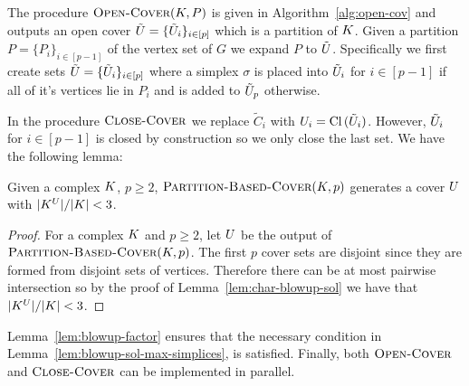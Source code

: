 \documentclass{jocg}
\begin{document}
The procedure $\textnormal{\scshape Open-Cover}(K,P)$ is given in Algorithm~\ref{alg:open-cov} and outputs an open cover $\tilde{U} = \{\tilde{U}_i\}_{i \in [p]}$ which is a partition of $K$. Given a partition $P = \{P_i\}_{i \in [p-1]}$ of the vertex set of $G$ we expand $P$ to $\tilde{U}$. Specifically we first create sets 
$\tilde{U} = \{\tilde{U}_i\}_{i \in [p]}$ where a simplex $\sigma$ is placed into $\tilde{U}_i$ for $i \in [p-1]$ 
if all of it's vertices lie in $P_i$ and is added to $\tilde{U}_p$ otherwise. 

In the procedure $\textnormal{\scshape Close-Cover}$ we replace $\tilde{C}_{i}$ with $U_i = \operatorname{Cl}{(\tilde{U}_i)}$. However, $\tilde{U}_i$ for $i \in [p-1]$ is closed by construction so we only close the last set.  We have the following lemma: 
\begin{lemma}
\label{lem:blowup-factor}
Given a complex $K$, $p \geq 2$, $\textnormal{\scshape Partition-Based-Cover}(K, p)$ 
generates a cover $U$ with $|K^{U}|/|K| < 3$. 
\end{lemma}
\begin{proof}
For a complex $K$ and $p \geq 2$, let $U$ be the output of 
$\textnormal{\scshape Partition-Based-Cover}(K,p)$. The first
$p$ cover sets are disjoint since they are formed from disjoint sets of vertices.
Therefore there can be at most pairwise intersection so by the proof of Lemma~\ref{lem:char-blowup-sol} we have that $|K^{U}|/|K| < 3$.
\end{proof}
Lemma~\ref{lem:blowup-factor} ensures that the necessary condition in Lemma~\ref{lem:blowup-sol-max-simplices}, is 
satisfied. Finally, both $\textnormal{\scshape Open-Cover}$ and $\textnormal{\scshape Close-Cover}$ can be implemented in parallel. 
\end{document}

